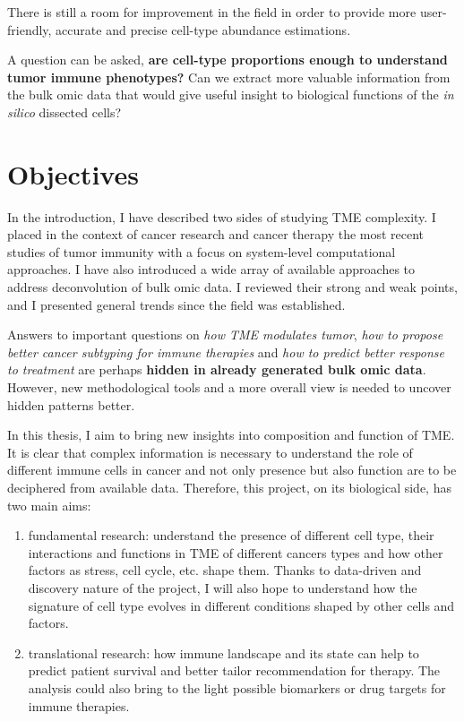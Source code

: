 \documentclass[12pt,]{book}
\providecommand{\tightlist}{%
  \setlength{\itemsep}{0pt}\setlength{\parskip}{0pt}}
\theoremstyle{definition}
\theoremstyle{definition}
\theoremstyle{definition}
\theoremstyle{remark}
\begin{document}
There is still a room for improvement in the field in order to provide
more user-friendly, accurate and precise cell-type abundance
estimations.

A question can be asked, \textbf{are cell-type proportions enough to
understand tumor immune phenotypes?} Can we extract more valuable
information from the bulk omic data that would give useful insight to
biological functions of the \emph{in silico} dissected cells?

\hypertarget{objectives}{%
\chapter*{Objectives}\label{objectives}}

In the introduction, I have described two sides of studying TME
complexity. I placed in the context of cancer research and cancer
therapy the most recent studies of tumor immunity with a focus on
system-level computational approaches. I have also introduced a wide
array of available approaches to address deconvolution of bulk omic
data. I reviewed their strong and weak points, and I presented general
trends since the field was established.

Answers to important questions on \emph{how TME modulates tumor},
\emph{how to propose better cancer subtyping for immune therapies} and
\emph{how to predict better response to treatment} are perhaps
\textbf{hidden in already generated bulk omic data}. However, new
methodological tools and a more overall view is needed to uncover hidden
patterns better.

In this thesis, I aim to bring new insights into composition and
function of TME. It is clear that complex information is necessary to
understand the role of different immune cells in cancer and not only
presence but also function are to be deciphered from available data.
Therefore, this project, on its biological side, has two main aims:

\begin{enumerate}
\def\labelenumi{\arabic{enumi}.}
\tightlist
\item
  fundamental research: understand the presence of different cell type,
  their interactions and functions in TME of different cancers types and
  how other factors as stress, cell cycle, etc. shape them. Thanks to
  data-driven and discovery nature of the project, I will also hope to
  understand how the signature of cell type evolves in different
  conditions shaped by other cells and factors.
\item
  translational research: how immune landscape and its state can help to
  predict patient survival and better tailor recommendation for therapy.
  The analysis could also bring to the light possible biomarkers or drug
  targets for immune therapies.
\end{enumerate}
\end{document}
